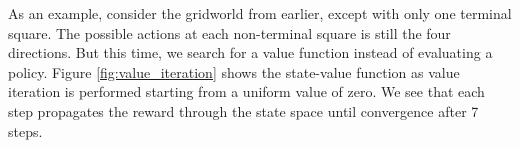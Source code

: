\documentclass[12pt, a4paper]{article}
\numberwithin{equation}{section}
\begin{document}
As an example, consider the gridworld from earlier, except with only one terminal square. The possible actions at each non-terminal square is still the four directions. But this time, we search for a value function instead of evaluating a policy. Figure \ref{fig:value_iteration} shows the state-value function as value iteration is performed starting from a uniform value of zero. We see that each step propagates the reward through the state space until convergence after 7 steps.
\end{document}
